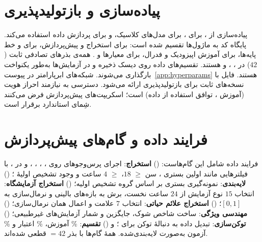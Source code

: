 \section{پیاده‌سازی و بازتولیدپذیری}

پیاده‌سازی از ،  برای ،  برای مدل‌های کلاسیک، و  برای پردازش داده استفاده می‌کند. پایگاه کد به ماژول‌ها تقسیم شده است: \texttt{} برای استخراج و پیش‌پردازش، \texttt{} برای  و خط پایه‌ها، \texttt{} برای آموزش اپیزودیک و فدرال، \texttt{} برای معیارها و . همه‌ی بذرهای تصادفی ثابت ($42$) در ، ، و  هستند. تقسیم‌های داده روی دیسک ذخیره و در آزمایش‌ها به‌طور یکنواخت بارگذاری می‌شوند. شبکه‌های ابرپارامتر در پیوست~\ref{app:hyperparams} هستند. فایل \texttt{} با نسخه‌های ثابت برای بازتولیدپذیری ارائه می‌شود. دسترسی به  نیازمند احراز هویت  (آموزش ، توافق استفاده از داده) است؛ اسکریپت‌های پیش‌پردازش فرض می‌کنند شِمای استاندارد  برقرار است.

\section{فرایند داده و گام‌های پیش‌پردازش}

فرایند داده شامل این گام‌هاست: () \textbf{استخراج}: اجرای پرس‌وجوهای  روی \texttt{}، \texttt{}، \texttt{}، \texttt{}، \texttt{} و \texttt{} در ، با فیلترهایی مانند اولین بستری ، سن $\geq$ $18$،  $\geq$ $4$ ساعت و وجود تشخیص اولیۀ ؛ () \textbf{لایه‌بندی}: نمونه‌گیری  بستری بر اساس گروه تشخیص اولیه؛ () \textbf{استخراج آزمایشگاه}: انتخاب $15$ نوع آزمایش از $24$ ساعت نخست، برش به بازه‌های بالینی و نرمال‌سازی  به $[0,1]$؛ () \textbf{استخراج علائم حیاتی}: انتخاب $7$ علامت و اعمال همان نرمال‌سازی؛ () \textbf{مهندسی ویژگی}: ساخت شاخص شوک، جایگزین  و شمار آزمایش‌های غیرطبیعی؛ () \textbf{توکن‌سازی}: تبدیل داده به دنبالۀ توکن برای ؛ و () \textbf{تقسیم}: \% آموزش، \% اعتبار و \% آزمون به‌صورت لایه‌بندی‌شده. همۀ گام‌ها با بذر $=42$ قطعی شده‌اند.

